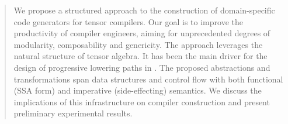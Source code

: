 \begin{abstract}
We propose a structured approach to the construction of domain-specific code generators for tensor compilers.
Our goal is to improve the productivity of compiler engineers, aiming for unprecedented degrees of modularity, composability and genericity.
The approach leverages the natural structure of tensor algebra.
It has been the main driver for the design of progressive lowering paths in \MLIR.
The proposed abstractions and transformations span data structures and control flow with both functional (SSA form) and imperative (side-effecting) semantics.
We discuss the implications of this infrastructure on compiler construction and present preliminary experimental results.
\end{abstract}
